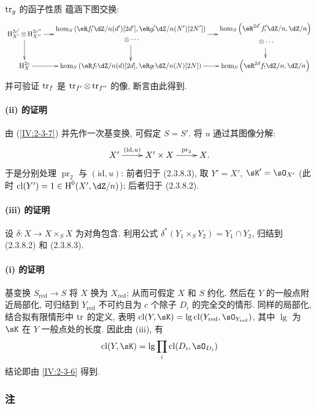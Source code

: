 $\operatorname{tr}_g$ 的函子性质 \cite[XVIII.2.12]{sga4} 蕴涵下图交换:
\small
\[\xymatrix@=0.5cm{
  \h_{X'}^{2c'}\otimes \h_{X''}^{2 c''}\ar[r] \ar[d]
    & {\begin{gathered}\hom_S\left(\eR f_!' \dZ/n(d')[2 d'],\eR g_!'\dZ/n(N')[2 N']\right)\\ {}\otimes \cdots\end{gathered}} \ar[r] \ar[d]
    & {\begin{gathered}\hom_S\left(\eR^{2 d'} f_!' \dZ/n,\dZ/n\right)\\ {}\otimes \cdots\end{gathered}} \ar[d] \\
  \h_X^{2 c} \ar[r]
    & \hom_S\left(\eR f_!\dZ/n(d)[2 d],\eR g_!\dZ/n(N)[2 N]\right) \ar[r]
    & \hom_S\left(\eR^{2 d}f_!\dZ/n,\dZ/n\right)
}\]
\normalsize
并可验证 $\operatorname{tr}_f$ 是 $\operatorname{tr}_{f'}\otimes \operatorname{tr}_{f''}$ 的像, 断言由此得到.

\paragraph{(ii) 的证明}
由 (\ref{IV:2-3-7}) 并先作一次基变换, 可假定 $S=S'$.
将 $u$ 通过其图像分解:
\[\xymatrix{
  X' \ar[r]^-{(\text{id},u)}
    & X'\times X \ar[r]^-{\operatorname{pr}_2}
    & X \text{.}
}\]
于是分别处理 $\operatorname{pr}_2$ 与 $(\text{id},u)$:
前者归于 (2.3.8.3), 取 $Y'=X'$, $\sK'=\sO_{X'}$
(此时 $\cl(Y')=1\in \h^0(X',\dZ/n)$); 后者归于 (2.3.8.2).

\paragraph{(iii) 的证明}
设 $\delta:X\to X\times_S X$ 为对角包含.
利用公式 $\delta^\ast(Y_1\times_S Y_2) = Y_1\cap Y_2$, 归结到 (2.3.8.2) 和 (2.3.8.3).

\paragraph{(i) 的证明}
基变换 $S_\text{red}\to S$ 将 $X$ 换为 $X_\text{red}$;
从而可假定 $X$ 和 $S$ 约化.
然后在 $Y$ 的一般点附近局部化, 可归结到 $Y_\text{red}$ 不可约且为 $c$ 个除子 $D_i$ 的完全交的情形.
同样的局部化, 结合拟有限情形中 $\operatorname{tr}$ 的定义, 表明
$\cl(Y,\sK)=\operatorname{lg}\cl(Y_\text{red},\sO_{Y_\text{red}})$,
其中 $\operatorname{lg}$ 为 $\sK$ 在 $Y$ 一般点处的长度.
因此由 (iii), 有
\[
  \cl(Y,\sK) = \operatorname{lg} \prod_i \cl(D_i,\sO_{D_i})
\]
结论即由 \ref{IV:2-3-6} 得到.

\subsubsection{注}\label{IV:2-3-9}

